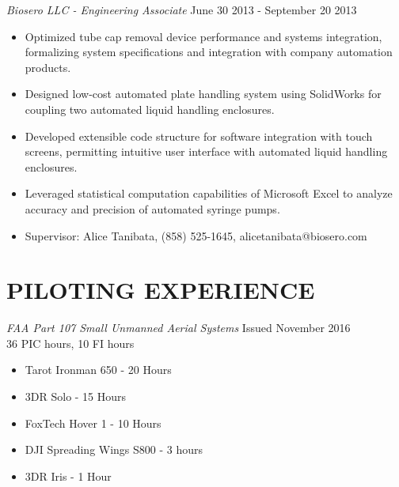 \documentclass[line,margin]{res}
\begin{document}
\begin{resume}
	{\sl Biosero LLC - Engineering Associate} \hfill June 30 2013 - September 20 2013
	\begin{itemize}
		\item Optimized tube cap removal device performance and systems integration, formalizing system specifications and integration with company automation products.
		\item Designed low-cost automated plate handling system using SolidWorks for coupling two automated liquid handling enclosures.
		\item Developed extensible code structure for software integration with touch screens, permitting intuitive user interface with automated liquid handling enclosures.
		\item Leveraged statistical computation capabilities of Microsoft Excel to analyze accuracy and precision of automated syringe pumps.
		\item Supervisor: Alice Tanibata, (858) 525-1645, alicetanibata@biosero.com
	\end{itemize}

\section{PILOTING EXPERIENCE}
	{\sl FAA Part 107 Small Unmanned Aerial Systems} \hfill Issued November 2016\\
	36 PIC hours, 10 FI hours\\
	\begin{itemize}
		\item Tarot Ironman 650 - 20 Hours
		\item 3DR Solo - 15 Hours
		\item FoxTech Hover 1 - 10 Hours
		\item DJI Spreading Wings S800 - 3 hours
		\item 3DR Iris - 1 Hour
	\end{itemize}


\end{resume}
\end{document}
